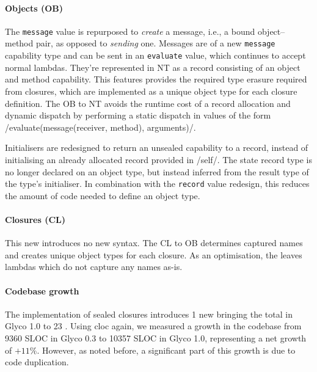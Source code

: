 \documentclass[main.tex]{subfiles}
\begin{document}
\paragraph{Objects (OB)} The \texttt{message} value is repurposed to \emph{create} a message, i.e., a bound object–method pair, as opposed to \emph{sending} one. Messages are of a new \texttt{message} capability type and can be sent in an \texttt{evaluate} value, which continues to accept normal lambdas. They're represented in NT as a record consisting of an object and method capability. This features provides the required type erasure required from closures, which are implemented as a unique object type for each closure definition. The OB to NT  avoids the runtime cost of a record allocation and dynamic dispatch by performing a static dispatch in values of the form \iil/evaluate(message(receiver, method), arguments)/.

Initialisers are redesigned to return an unsealed capability to a record, instead of initialising an already allocated record provided in \iil/self/. The state record type is no longer declared on an object type, but instead inferred from the result type of the type's initialiser. In combination with the \texttt{record} value redesign, this reduces the amount of code needed to define an object type.

\paragraph{Closures (CL)} This new  introduces no new syntax. The CL to OB  determines captured names and creates unique object types for each closure. As an optimisation, the  leaves lambdas which do not capture any names as-is.

\paragraph{Codebase growth} The implementation of sealed closures introduces 1 new  bringing the total in Glyco 1.0 to 23 . Using cloc again, we measured a growth in the codebase from 9360 SLOC in Glyco 0.3 to 10357 SLOC in Glyco 1.0, representing a net growth of $+11\%$. However, as noted before, a significant part of this growth is due to code duplication.

\onlyinsubfile{\glsaddall\printglossaries}
\end{document}
